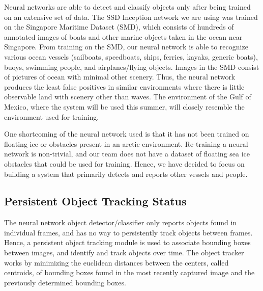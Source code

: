 \documentclass[onecolumn, draftclsnofoot,10pt, compsoc]{IEEEtran}
\begin{document}
Neural networks are able to detect and classify objects only after being trained on an extensive set of data. The SSD Inception network we are using was trained on the Singapore Maritime Dataset (SMD), 
which consists of hundreds of annotated images of boats and other marine objects  taken in the ocean near Singapore. From training on the SMD, our neural network is able to recognize various ocean vessels (sailboats, speedboats, ships, ferries, kayaks, generic boats), buoys, swimming people, and airplanes/flying objects. Images in the SMD consist of pictures of ocean with minimal other scenery. Thus, the neural network produces the least false positives in similar environments where there is little observable land with scenery other than waves. The environment of the Gulf of Mexico, where the system will be used this summer, will closely resemble the environment used for training. 

One shortcoming of the neural network used is that it has not been trained on floating ice or obstacles present in an arctic environment. Re-training a neural network is non-trivial, and our team does not have a dataset of floating sea ice obstacles that could be used for training. Hence, we have decided to focus on building a system that primarily detects and reports other vessels and people.

\subsection{Persistent Object Tracking Status}
\label{sec:2.5}
The neural network object detector/classifier only reports objects found in individual frames, and has no way to persistently track objects between frames. Hence, a persistent object tracking module is used to associate bounding boxes between images, and identify and track objects over time. The object tracker works by minimizing the euclidean distances between the centers, called centroids, of bounding boxes found in the most recently captured image and the previously determined bounding boxes.
\end{document}
